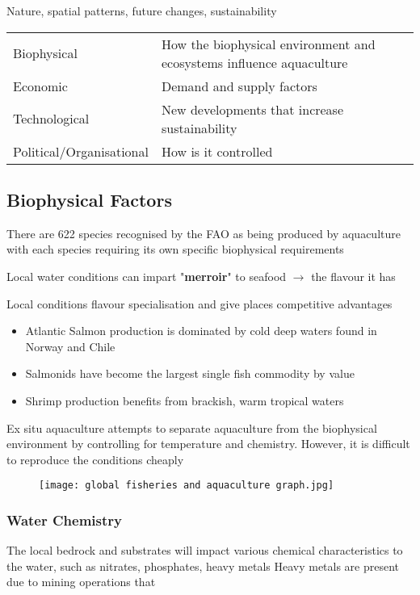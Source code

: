 	Nature, spatial patterns, future changes, sustainability

	\begin{table}[htbp]
		\centering
		\begin{tabular}{ll}
			Biophysical & How the biophysical environment and ecosystems influence aquaculture \\
			Economic & Demand and supply factors \\
			Technological & New developments that increase sustainability \\
			Political/Organisational & How is it controlled \\
		\end{tabular}
	\end{table}

	\subsection{Biophysical Factors}
		There are 622 species recognised by the FAO as being produced by aquaculture with each species requiring its own specific biophysical requirements

		Local water conditions can impart "\textbf{merroir}" to seafood $\rightarrow$ the flavour it has

		Local conditions flavour specialisation and give places competitive advantages
		\begin{itemize}
			\item Atlantic Salmon production is dominated by cold deep waters found in Norway and Chile
			\item Salmonids have become the largest single fish commodity by value
			\item Shrimp production benefits from brackish, warm tropical waters
		\end{itemize}

		Ex situ aquaculture attempts to separate aquaculture from the biophysical environment by controlling for temperature and chemistry. However, it is difficult to reproduce the conditions cheaply

		\begin{figure}[H]
			\centering
			\texttt{[image: global fisheries and aquaculture graph.jpg]}
		\end{figure}

		\subsubsection{Water Chemistry}
			The local bedrock and substrates will impact various chemical characteristics to the water, such as nitrates, phosphates, heavy metals
			Heavy metals are present due to mining operations that 

